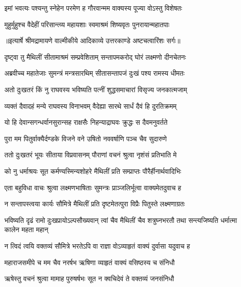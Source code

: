 \twolineshloka
{इमां भवत्यः पश्यन्तु स्नेहेन परमेण ह}
{गौरवान्मम वाक्यस्य पूज्या वोऽस्तु विशेषतः} %

\twolineshloka
{मुहुर्मुहुश्च वैदेहीं परिसान्त्व्य महायशाः}
{स्वमाश्रमं शिष्यवृतः पुनरायान्महातपाः} %


{॥इत्यार्षे श्रीमद्रामायणे वाल्मीकीये आदिकाव्ये उत्तरकाण्डे अष्टचत्वारिंशः सर्गः॥}


\twolineshloka
{दृष्ट्वा तु मैथिलीं सीतामाश्रमं सम्प्रवेशिताम्}
{सन्तापमकरोद् घोरं लक्ष्मणो दीनचेतनः} %

\twolineshloka
{अब्रवीच्च महातेजाः सुमन्त्रं मन्त्रसारथिम्}
{सीतासन्तापजं दुःखं पश्य रामस्य धीमतः} %

\twolineshloka
{अतो दुःखतरं किं नु राघवस्य भविष्यति}
{पत्नीं शुद्धसमाचारां विसृज्य जनकात्मजाम्} %

\twolineshloka
{व्यक्तं दैवादहं मन्ये राघवस्य विनाभवम्}
{वैदेह्या सारथे सार्धं दैवं हि दुरतिक्रमम्} %

\twolineshloka
{यो हि देवान्सगन्धर्वानसुरान्सह राक्षसैः}
{निहन्याद्राघवः क्रुद्धः स दैवमनुवर्तते} %

\twolineshloka
{पुरा मम पितुर्वाक्यैर्दण्डके विजने वने}
{उषितो नववर्षाणि पञ्च चैव सुदारुणे} %

\twolineshloka
{ततो दुःखतरं भूयः सीताया विप्रवासनम्}
{पौराणां वचनं श्रुत्वा नृशंसं प्रतिभाति मे} %

\twolineshloka
{को नु धर्माश्रयः सूत कर्मण्यस्मिन्यशोहरे}
{मैथिलीं प्रति सम्प्राप्तः पौरैर्हीनार्थवादिभिः} %

\twolineshloka
{एता बहुविधा वाचः श्रुत्वा लक्ष्मणभाषिताः}
{सुमन्त्रः प्राञ्जलिर्भूत्वा वाक्यमेतदुवाच ह} %

\twolineshloka
{न सन्तापस्त्वया कार्यः सौमित्रे मैथिलीं प्रति}
{दृष्टमेतत्पुरा विप्रैः पितुस्ते लक्ष्मणाग्रतः} %

\threelineshloka
{भविष्यति दृढं रामो दुःखप्रायोऽल्पसौख्यवान्}
{त्वां चैव मैथिलीं चैव शत्रुघ्नभरतौ तथा}
{सन्त्यजिष्यति धर्मात्मा कालेन महता महान्} %

\twolineshloka
{न त्विदं त्वयि वक्तव्यं सौमित्रे भरतेऽपि वा}
{राज्ञा वोऽव्याहृतं वाक्यं दुर्वासा यदुवाच ह} %

\twolineshloka
{महाराजसमीपे च मम चैव नरर्षभ}
{ऋषिणा व्याहृतं वाक्यं वसिष्ठस्य च संनिधौ} %

\twolineshloka
{ऋषेस्तु वचनं श्रुत्वा मामाह पुरुषर्षभः}
{सूत न क्वचिदेवं ते वक्तव्यं जनसंनिधौ} %

